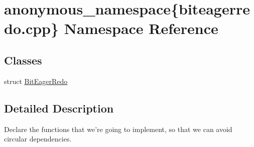\hypertarget{namespaceanonymous__namespace_02biteagerredo_8cpp_03}{\section{anonymous\-\_\-namespace\{biteagerredo.\-cpp\} Namespace Reference}
\label{namespaceanonymous__namespace_02biteagerredo_8cpp_03}
}
\subsection*{Classes}
\begin{DoxyCompactItemize}
\item 
struct \hyperlink{structanonymous__namespace_02biteagerredo_8cpp_03_1_1BitEagerRedo}{Bit\-Eager\-Redo}
\end{DoxyCompactItemize}


\subsection{Detailed Description}
Declare the functions that we're going to implement, so that we can avoid circular dependencies. 